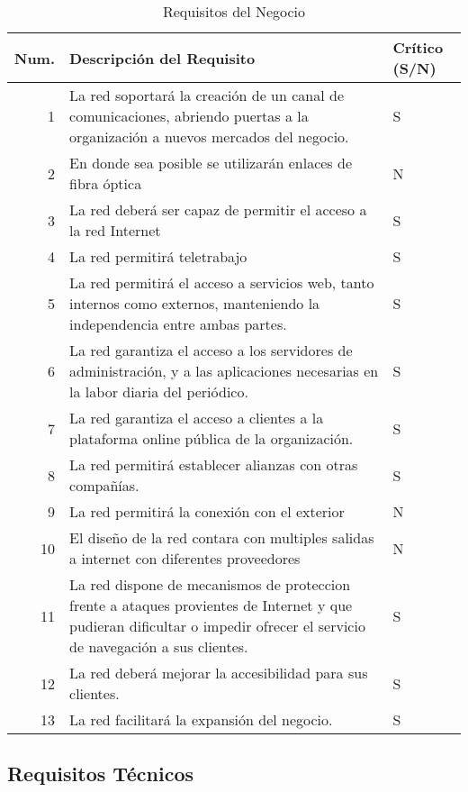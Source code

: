 \documentclass[a4paper,onecolumn,11pt]{article}
\begin{document}
\begin{table}[htbp]
\small \sffamily
\caption{Requisitos del Negocio}
\begin{center}
\begin{tabular}{rp{}p{}}
\toprule
\textbf{Num.} &  \textbf{Descripción del Requisito} & \textbf{Crítico (S/N)} \\
\toprule
1 & La red soportará la creación de un canal de comunicaciones, abriendo puertas a la organización a nuevos mercados del negocio. & S \\ \midrule
2 & En donde sea posible se utilizarán enlaces de fibra óptica & N \\\midrule
3 & La red deberá ser capaz de permitir el acceso a la red Internet & S \\\midrule
4 & La red permitirá teletrabajo & S \\\midrule
5 & La red permitirá el acceso a servicios web, tanto internos como externos, manteniendo la independencia entre ambas partes.& S \\\midrule
6 & La red garantiza el acceso a los servidores de administración, y a las aplicaciones necesarias en la labor diaria del periódico.& S \\\midrule
7 & La red garantiza el acceso a clientes a la plataforma online pública de la organización. & S \\\midrule
8 & La red permitirá establecer alianzas con otras compañías. & S \\\midrule
9 & La red permitirá la conexión con el exterior & N \\\midrule
10 & El diseño de la red contara con multiples salidas a internet con diferentes proveedores & N \\\midrule
11 & La red dispone de mecanismos de proteccion frente a ataques provientes de Internet y que pudieran dificultar o impedir ofrecer el servicio de navegación a sus clientes. & S \\\midrule
12 & La red deberá mejorar la accesibilidad para sus clientes. & S \\ \midrule
13 & La red facilitará la expansión del negocio. & S \\



\bottomrule
\end{tabular}
\end{center}
\label{tab:requisitosNegocio}
\end{table}


\subsection{Requisitos Técnicos}
\end{document}
